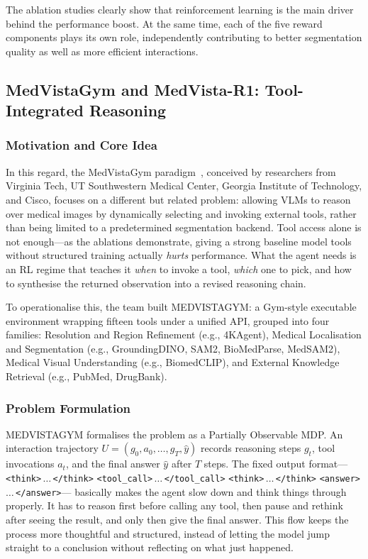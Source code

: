 \documentclass[12pt, a4paper]{article}
\begin{document}
The ablation studies clearly show that reinforcement learning is the main driver behind
the performance boost.
At the same time, each of the five reward components plays its own role, independently
contributing to better segmentation quality as well as more efficient interactions.

\subsection{MedVistaGym and MedVista-R1: Tool-Integrated Reasoning}
\label{sec:medvista}

\subsubsection{Motivation and Core Idea}

In this regard, the MedVistaGym paradigm~\cite{medvistagym}, conceived by researchers
from Virginia Tech, UT Southwestern Medical Center, Georgia Institute of Technology,
and Cisco, focuses on a different but related problem: allowing VLMs to reason over
medical images by dynamically selecting and invoking external tools, rather than being
limited to a predetermined segmentation backend.
Tool access alone is not enough---as the ablations demonstrate, giving a strong
baseline model tools without structured training actually \emph{hurts} performance.
What the agent needs is an RL regime that teaches it \emph{when} to invoke a tool,
\emph{which} one to pick, and how to synthesise the returned observation into a revised
reasoning chain.

To operationalise this, the team built MEDVISTAGYM: a Gym-style executable environment
wrapping fifteen tools under a unified API, grouped into four families: Resolution and
Region Refinement (e.g., 4KAgent), Medical Localisation and Segmentation (e.g.,
GroundingDINO, SAM2, BioMedParse, MedSAM2), Medical Visual Understanding
(e.g., BiomedCLIP), and External Knowledge Retrieval (e.g., PubMed, DrugBank).

\subsubsection{Problem Formulation}

MEDVISTAGYM formalises the problem as a Partially Observable MDP.
An interaction trajectory $U = (g_0, a_0, \ldots, g_T, \hat{y})$ records reasoning
steps $g_t$, tool invocations $a_t$, and the final answer $\hat{y}$ after $T$ steps.
The fixed output format---
\texttt{<think>}\,$\ldots$\,\texttt{</think>}
\texttt{<tool\_call>}\,$\ldots$\,\texttt{</tool\_call>}
\texttt{<think>}\,$\ldots$\,\texttt{</think>}
\texttt{<answer>}\,$\ldots$\,\texttt{</answer>}---
basically makes the agent slow down and think things through properly.
It has to reason first before calling any tool, then pause and rethink after seeing the
result, and only then give the final answer.
This flow keeps the process more thoughtful and structured, instead of letting the
model jump straight to a conclusion without reflecting on what just happened.
\end{document}
